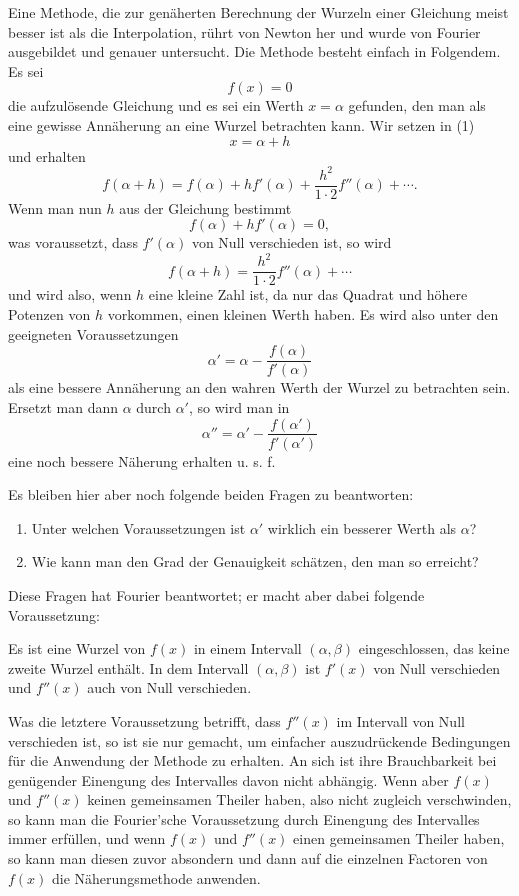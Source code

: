 \documentclass[11pt]{article}
\begin{document}
Eine Methode, die zur genäherten Berechnung der Wurzeln einer Gleichung meist besser ist als die Interpolation, rührt von Newton her und wurde von Fourier ausgebildet und genauer untersucht. Die Methode besteht einfach in Folgendem. Es sei
\begin{equation}
        f(x)=0
\tag{1}
\end{equation}
die aufzulösende Gleichung und es sei ein Werth $x=\alpha$ gefunden, den man als eine gewisse Annäherung an eine Wurzel betrachten kann. Wir setzen in (1)
\[
        x=\alpha+h
\]
und erhalten
\begin{equation}
        f(\alpha+h)=f(\alpha)+hf'(\alpha)+\frac{h^2}{1\cdot2}f''(\alpha)+\cdots .
\tag{2}
\end{equation}
Wenn man nun $h$ aus der Gleichung bestimmt
\begin{equation}
        f(\alpha)+hf'(\alpha)=0,
\tag{3}
\end{equation}
was voraussetzt, dass $f'(\alpha)$ von Null verschieden ist, so wird
\[
        f(\alpha+h)=\frac{h^2}{1\cdot2}f''(\alpha)+\cdots
\]
und wird also, wenn $h$ eine kleine Zahl ist, da nur das Quadrat und höhere Potenzen von $h$ vorkommen, einen kleinen Werth haben. Es wird also unter den geeigneten Voraussetzungen
\begin{equation}
        \alpha'=\alpha-\frac{f(\alpha)}{f'(\alpha)}
\tag{4}
\end{equation}
als eine bessere Annäherung an den wahren Werth der Wurzel zu betrachten sein. Ersetzt man dann $\alpha$ durch $\alpha'$, so wird man in
\[
        \alpha''=\alpha'-\frac{f(\alpha')}{f'(\alpha')}
\]
eine noch bessere Näherung erhalten u. s. f.

Es bleiben hier aber noch folgende beiden Fragen zu beantworten:
\begin{enumerate}[label=\arabic*.]
\item Unter welchen Voraussetzungen ist $\alpha'$ wirklich ein besserer Werth als $\alpha$?
\item Wie kann man den Grad der Genauigkeit schätzen, den man so erreicht?
\end{enumerate}
Diese Fragen hat Fourier beantwortet; er macht aber dabei folgende Voraussetzung:

Es ist eine Wurzel von $f(x)$ in einem Intervall $(\alpha,\beta)$ eingeschlossen, das keine zweite Wurzel enthält. In dem Intervall $(\alpha,\beta)$ ist $f'(x)$ von Null verschieden und $f''(x)$ auch von Null verschieden.

Was die letztere Voraussetzung betrifft, dass $f''(x)$ im Intervall von Null verschieden ist, so ist sie nur gemacht, um einfacher auszudrückende Bedingungen für die Anwendung der Methode zu erhalten. An sich ist ihre Brauchbarkeit bei genügender Einengung des Intervalles davon nicht abhängig. Wenn aber $f(x)$ und $f''(x)$ keinen gemeinsamen Theiler haben, also nicht zugleich verschwinden, so kann man die Fourier'sche Voraussetzung durch Einengung des Intervalles immer erfüllen, und wenn $f(x)$ und $f''(x)$ einen gemeinsamen Theiler haben, so kann man diesen zuvor absondern und dann auf die einzelnen Factoren von $f(x)$ die Näherungsmethode anwenden.
\end{document}
